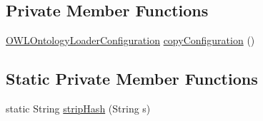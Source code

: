 \subsection*{Private Member Functions}
\begin{DoxyCompactItemize}
\item 
\hyperlink{classorg_1_1semanticweb_1_1owlapi_1_1model_1_1_o_w_l_ontology_loader_configuration}{O\-W\-L\-Ontology\-Loader\-Configuration} \hyperlink{classorg_1_1semanticweb_1_1owlapi_1_1model_1_1_o_w_l_ontology_loader_configuration_a25dfec2b830e4eebffb12bf464f47651}{copy\-Configuration} ()
\end{DoxyCompactItemize}
\subsection*{Static Private Member Functions}
\begin{DoxyCompactItemize}
\item 
static String \hyperlink{classorg_1_1semanticweb_1_1owlapi_1_1model_1_1_o_w_l_ontology_loader_configuration_ad374655d8ccfdf7a17fa7397f237b9ce}{strip\-Hash} (String s)
\end{DoxyCompactItemize}
